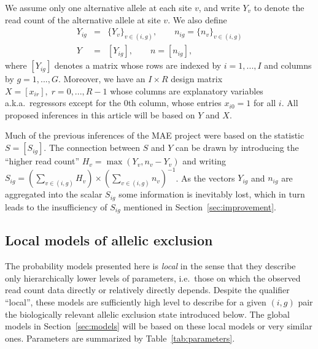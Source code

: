 \documentclass[letterpaper]{article}
\begin{document}
We assume only one alternative allele at each site \(v\), and write \(Y_v\) to
denote the read count of the alternative allele at site \(v\).  We also define 
\begin{eqnarray}
\label{eq:Y-ig-def}
Y_{ig} &=&  \{Y_v\}_{v\in(i,g)}, \qquad n_{ig} = \{n_v\}_{v\in(i,g)} \\
\label{eq:Y-def}
Y &=&  [Y_{ig}], \qquad n = [n_{ig}],
\end{eqnarray}
where \([Y_{ig}]\) denotes a matrix whose rows are indexed by \(i=1,...,I\)
and columns by \(g=1,...,G\).  Moreover, we have an \(I\times R\) design matrix \(X =
[x_{ir}], \; r=0,...,R-1\) whose columns are explanatory variables
a.k.a.~regressors except for the 0th column, whose entries \(x_{i0}=1\)
for all \(i\). All
proposed inferences in this article will be based on \(Y\) and \(X\).

Much of the previous inferences of the MAE project were based on the statistic
\(S = [S_{ig}]\). The connection between \(S\) and \(Y\) can be drawn by
introducing the ``higher read count'' \(H_{v} = \max(Y_v, n_v-Y_v)\) and
writing \(S_{ig} = \left( \sum_{v\in(i,g)} H_v \right) \times \left(
\sum_{v\in(i,g)} n_v \right)^{-1}\).  As the vectors \(Y_{ig}\) and \(n_{ig}\)
are aggregated into the scalar \(S_{ig}\) some information is inevitably lost,
which in turn leads to the insufficiency of \(S_{ig}\) mentioned in
Section~\ref{sec:improvement}.

\subsection{Local models of allelic exclusion}
\label{sec:local-model}

The probability models presented here is \emph{local} in the sense that they
describe only hierarchically lower levels of parameters, i.e.~those on which
the observed read count data directly or relatively directly depends.  Despite
the qualifier ``local'', these models are sufficiently high level to describe
for a given \((i,g)\) pair the biologically relevant allelic exclusion state
introduced below.  The global models in Section~\ref{sec:models} will be based
on these local models or very similar ones.  Parameters are summarized by
Table~\ref{tab:parameters}.
\end{document}
